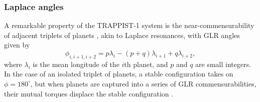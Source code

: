 \documentclass[twocolumn]{aastex63}
\begin{document}
%
%

\subsubsection{Laplace angles}

A remarkable property of the TRAPPIST-1 system is the near-commensurability
of adjacent triplets of planets \citep{Luger2017a}, akin to Laplace resonances, with
GLR angles given by
\begin{equation}
    \phi_{i,i+1,i+2} = p \lambda_i - (p+q) \lambda_{i+1} + q \lambda_{i+2},
\end{equation}
where $\lambda_i$ is the mean longitude of the $i$th planet, and $p$ and
$q$ are small integers.  In
the case of an isolated triplet of planets, a stable configuration takes
on $\phi = 180^\circ$, but when planets are captured into a series of GLR
commensurabilities, their mutual torques displace the stable configuration
\citep{Delisle2017}.
\end{document}
